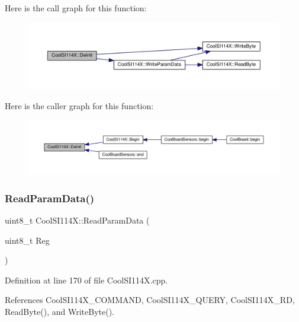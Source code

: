 Here is the call graph for this function\+:\nopagebreak
\begin{figure}[H]
\begin{center}
\leavevmode
\includegraphics[width=350pt]{dd/d67/class_cool_s_i114_x_a6840abd53a2e3d71a6bb918077c6d6e6_cgraph}
\end{center}
\end{figure}
Here is the caller graph for this function\+:\nopagebreak
\begin{figure}[H]
\begin{center}
\leavevmode
\includegraphics[width=350pt]{dd/d67/class_cool_s_i114_x_a6840abd53a2e3d71a6bb918077c6d6e6_icgraph}
\end{center}
\end{figure}
\mbox{\label{class_cool_s_i114_x_a33cf431103c722442f6a0cc93848d640}} 
\subsubsection{\texorpdfstring{Read\+Param\+Data()}{ReadParamData()}}
{\footnotesize\ttfamily uint8\+\_\+t Cool\+S\+I114\+X\+::\+Read\+Param\+Data (\begin{DoxyParamCaption}\item[{uint8\+\_\+t}]{Reg }\end{DoxyParamCaption})}



Definition at line 170 of file Cool\+S\+I114\+X.\+cpp.



References Cool\+S\+I114\+X\+\_\+\+C\+O\+M\+M\+A\+ND, Cool\+S\+I114\+X\+\_\+\+Q\+U\+E\+RY, Cool\+S\+I114\+X\+\_\+\+RD, Read\+Byte(), and Write\+Byte().

